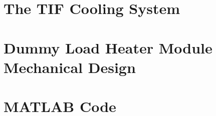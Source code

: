\documentclass{report}
\begin{document}
\chapter{The TIF Cooling System}\label{app:TIF}
%
%
%
%

\chapter{Dummy Load Heater Module Mechanical Design} \label{app:DummyLoad}



\chapter{MATLAB Code} \label{app:Matlab}

\end{document}

